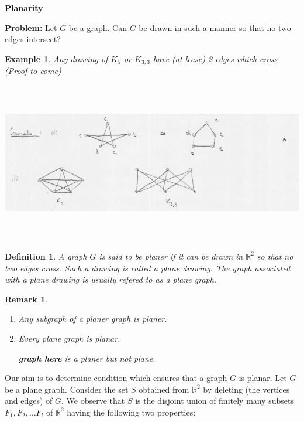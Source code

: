 \documentclass[12pt]{article}
\newtheorem{example}{Example}
\newtheorem{definition}{Definition}
\newtheorem*{remark}{Remark}
\begin{document}
\textbf{Planarity}

\textbf{Problem:} Let $G$ be a graph. Can $G$ be drawn in such a manner so that no two edges intersect?


\begin{example}

	Any drawing of $K_{5}$ or $K_{3,3}$ have (at lease) 2 edges which cross (Proof to come)
	\begin{center}
		\includegraphics[width=15cm,height=7cm]{example1}
	\end{center}
\end{example}


\begin{definition}
	A graph $G$ is said to be planer if it can be drawn in $\mathbb{R}^{2}$ so that no two edges cross. Such a drawing is called a plane drawing. The graph associated with a plane drawing is usually refered to as a plane graph.
\end{definition}

\begin{remark}

	\begin{enumerate}
		\item Any subgraph of a planer graph is planer.
		\item Every plane graph is planar.

		      \textbf{graph here}
		      is a planer but not plane.
	\end{enumerate}

\end{remark}


Our aim is to determine condition which ensures that a graph $G$ is planar. Let $G$ be a plane graph. Consider the set $S$ obtained from $\mathbb{R}^{2}$ by deleting (the vertices and edges) of $G$.
We observe that $S$ is the disjoint union of finitely many subsets $F_{1}, F_{2},\dots F_{l}$ of $\mathbb{R}^{2}$ having the following two properties:
\end{document}
